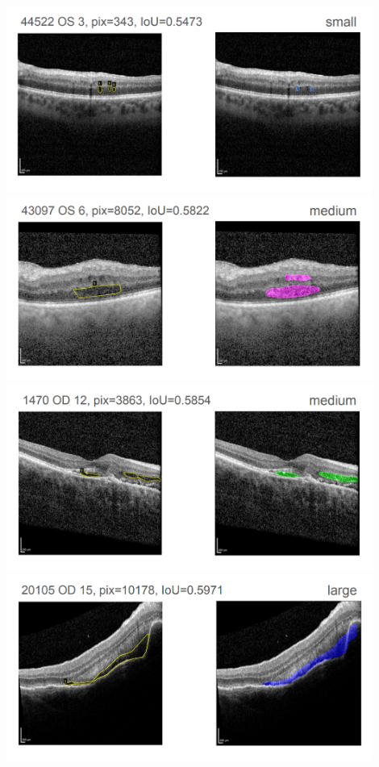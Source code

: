 \includegraphics[width=0.9\textwidth]{./pic/Segmentierung/Segmentierungsergebnisse/17.PNG}
\includegraphics[width=0.9\textwidth]{./pic/Segmentierung/Segmentierungsergebnisse/18.PNG}
\includegraphics[width=0.9\textwidth]{./pic/Segmentierung/Segmentierungsergebnisse/19.PNG}
\includegraphics[width=0.9\textwidth]{./pic/Segmentierung/Segmentierungsergebnisse/20.PNG}
